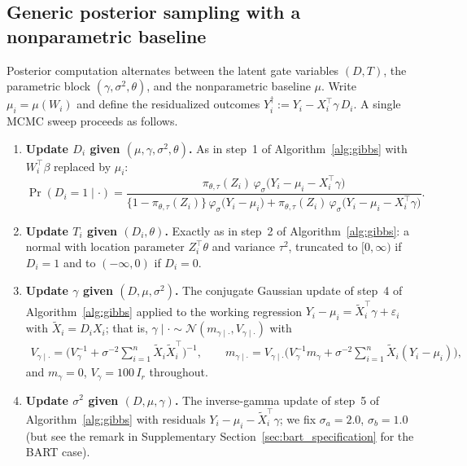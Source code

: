 \documentclass[11pt]{article}
\theoremstyle{definition}
\theoremstyle{plain}
\begin{document}
\subsection{Generic posterior sampling with a nonparametric baseline}
\label{sec:generic_post_sample}

Posterior computation alternates between the latent gate variables $(D,T)$, the parametric block $(\gamma,\sigma^2,\theta)$, and the nonparametric baseline $\mu$. Write $\mu_i=\mu(W_i)$ and define the residualized outcomes $Y_i^\dagger:=Y_i-X_i^\top\gamma\,D_i$. A single MCMC sweep proceeds as follows.

\begin{enumerate}[leftmargin=*,nosep]
\item \textbf{Update $D_i$ given $(\mu,\gamma,\sigma^2,\theta)$.}
As in step~1 of Algorithm~\ref{alg:gibbs} with $W_i^\top\beta$ replaced by $\mu_i$:
\begin{equation*}
\Pr(D_i=1\mid\cdot)=
\frac{\pi_{\theta,\tau}(Z_i)\,\varphi_\sigma\!\big(Y_i-\mu_i-X_i^\top\gamma\big)}
{\{1-\pi_{\theta,\tau}(Z_i)\}\,\varphi_\sigma\!\big(Y_i-\mu_i\big)+\pi_{\theta,\tau}(Z_i)\,\varphi_\sigma\!\big(Y_i-\mu_i-X_i^\top\gamma\big)}.
\end{equation*}
\item \textbf{Update $T_i$ given $(D_i,\theta)$.}
Exactly as in step~2 of Algorithm~\ref{alg:gibbs}: a normal with location parameter $Z_i^\top\theta$ and variance $\tau^2$, truncated to $[0,\infty)$ if $D_i=1$ and to $(-\infty,0)$ if $D_i=0$.
\item \textbf{Update $\gamma$ given $(D,\mu,\sigma^2)$.}
The conjugate Gaussian update of step~4 of Algorithm~\ref{alg:gibbs} applied to the working regression $Y_i-\mu_i=\widetilde X_i^\top\gamma+\varepsilon_i$ with $\widetilde X_i=D_iX_i$; that is, $\gamma\mid\cdot\sim\mathcal N(m_{\gamma\mid\cdot},V_{\gamma\mid\cdot})$ with
\begin{align*}
    V_{\gamma\mid\cdot} =\Big(V_\gamma^{-1}+\sigma^{-2}\sum_{i=1}^n \widetilde X_i\widetilde X_i^\top\Big)^{-1},\qquad
    m_{\gamma\mid\cdot} = V_{\gamma\mid\cdot}\Big(V_\gamma^{-1}m_\gamma+\sigma^{-2}\sum_{i=1}^n \widetilde X_i (Y_i-\mu_i)\Big),
\end{align*}
and $m_\gamma=0$, $V_\gamma=100\,I_r$ throughout.
\item \textbf{Update $\sigma^2$ given $(D,\mu,\gamma)$.}
The inverse-gamma update of step~5 of Algorithm~\ref{alg:gibbs} with residuals $Y_i-\mu_i-\widetilde X_i^\top\gamma$; we fix $\sigma_a=2.0$, $\sigma_b=1.0$ (but see the remark in Supplementary Section~\ref{sec:bart_specification} for the BART case).

\end{enumerate}
\end{document}
